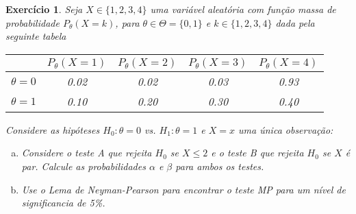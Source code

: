\documentclass[letter,11pt]{article}
\newtheorem{exer}{Exercício}
\begin{document}
\begin{exer} \rm
Seja $X\in\{1,2,3,4\}$ uma variável aleatória com função massa de probabilidade $P_\theta(X=k)$, para $\theta\in\Theta=\{0,1\}$ e $k\in\{1,2,3,4\}$ dada pela seguinte tabela

\begin{center}
\begin{tabular}{c|cccc}
&$P_\theta(X=1)$&$P_\theta(X=2)$&$P_\theta(X=3)$&$P_\theta(X=4)$\\
\hline
$\theta=0$ &0.02&0.02&0.03&0.93\\
$\theta=1$ &0.10&0.20&0.30&0.40\\
\end{tabular}
\end{center}
Considere as hipóteses $H_0:\theta=0$ vs. $H_1:\theta=1$ e $X=x$ uma única observação:
\begin{enumerate}[a)] 
  \item Considere o teste A que rejeita $H_0$ se $X\leq 2$ e o teste B que rejeita $H_0$ se $X$ é par. Calcule as probabilidades $\alpha$ e $\beta$ para ambos os testes.
  \item Use o Lema de Neyman-Pearson para encontrar o teste MP para um nível de significancia de 5\%.
\end{enumerate}
\end{exer}
\end{document}
